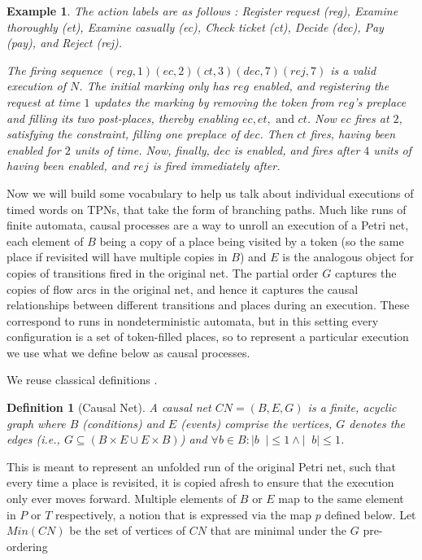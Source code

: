 \documentclass[conference]{IEEEtran}
\DeclareMathOperator*{\pre}{^\bullet}
\newtheorem{definition}{Definition}
\newtheorem{example}{Example}
\begin{document}
\begin{example}
        The action labels are as follows : Register request (reg), Examine thoroughly  (et), Examine casually (ec), Check ticket (ct), Decide (dec), Pay (pay), and Reject (rej). 
        
        The firing sequence $(reg, 1) (ec, 2)(ct, 3)(dec, 7)(rej, 7)$ is a valid execution of $N$. The initial marking only has $reg$ enabled, and registering the request at time $1$ updates the marking by removing the token from $reg$'s preplace and filling its two post-places, thereby enabling $ec, et, \textrm{ and } ct$. Now $ec$ fires at $2$, satisfying the constraint, filling one preplace of $dec$. Then $ct$ fires, having been enabled for $2$ units of time. Now, finally, $dec$ is enabled, and fires after $4$ units of having been enabled, and $rej$ is fired immediately after. 
    \end{example}
    
    Now we will build some vocabulary to help us talk about individual executions of timed words on TPNs, that take the form of branching paths. Much like runs of finite automata, causal processes are a way to unroll an execution of a Petri net, each element of $B$ being a copy of a place being visited by a token (so the same place if revisited will have multiple copies in $B$) and $E$ is the analogous object for copies of transitions fired in the original net. The partial order $G$ captures the copies of flow arcs in the original net, and hence it captures the causal relationships between different transitions and places during an execution. 
    These correspond to runs in nondeterministic automata, but in this setting every configuration is a set of token-filled places, so to represent a particular execution we use what we define below as causal processes.

    We reuse classical definitions \cite{Winskel86}.
    \begin{definition}[Causal Net] \label{cn}
        A \textit{causal net} $CN = (B, E, G)$ is a finite, acyclic graph where 
     $B$ (conditions) and $E$ (events) comprise the vertices, $G$ denotes the edges (i.e., $G \subseteq (B \times E \cup E \times B)$) and $\forall b \in B : |b \pre| \leq 1 \wedge | \pre b| \leq 1$.
    \end{definition}
    
    This is meant to represent an unfolded run of the original Petri net, such that every time a place is revisited, it is copied afresh to ensure that the execution only ever moves forward. 
    Multiple elements of $B$ or $E$ map to the same element in $P$ or $T$ respectively, a notion that is expressed via the map $p$ defined below. Let $Min(CN)$ be the set of vertices of $CN$ that are minimal under the $G$ pre-ordering
    
\end{document}
